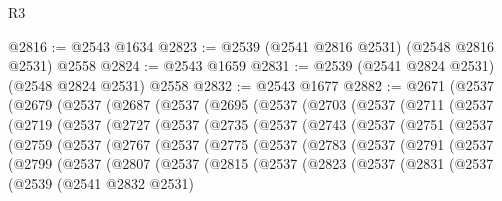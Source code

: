 \begin{lexlean}{R3}
\begin{coremodule}
@2816 := @2543 @1634
@2823 := @2539 (@2541 @2816 @2531) (@2548 @2816 @2531) @2558
@2824 := @2543 @1659
@2831 := @2539 (@2541 @2824 @2531) (@2548 @2824 @2531) @2558
@2832 := @2543 @1677
@2882 := @2671
    (@2537
      (@2679
        (@2537
          (@2687
            (@2537
              (@2695
                (@2537
                  (@2703
                    (@2537
                      (@2711
                        (@2537
                          (@2719
                            (@2537
                              (@2727
                                (@2537
                                  (@2735
                                    (@2537
                                      (@2743
                                        (@2537
                                          (@2751
                                            (@2537
                                              (@2759
                                                (@2537
                                                  (@2767
                                                    (@2537
                                                      (@2775
                                                        (@2537
                                                          (@2783
                                                            (@2537
                                                              (@2791
                                                                (@2537
                                                                  (@2799
                                                                    (@2537
                                                                      (@2807
                                                                        (@2537
                                                                          (@2815
                                                                            (@2537
                                                                              (@2823
                                                                                (@2537
                                                                                  (@2831
                                                                                    (@2537
                                                                                      (@2539
                                                                                        (@2541
                                                                                          @2832
                                                                                          @2531)

\end{coremodule}
\end{lexlean}
